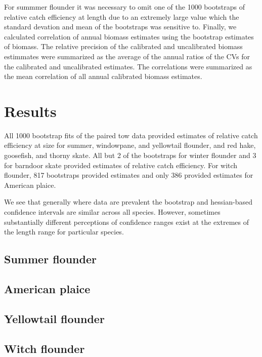 \documentclass[]{article}
\begin{document}
For summmer flounder it was necessary to omit one of the 1000 bootstraps
of relative catch efficiency at length due to an extremely large value
which the standard devation and mean of the bootstraps was sensitive to.
Finally, we calculated correlation of annual biomass estimates using the
bootstrap estimates of biomass. The relative precision of the calibrated
and uncalibrated biomass estimmates were summarized as the average of
the annual ratios of the CVs for the calibrated and uncalibrated
estimates. The correlations were summarized as the mean correlation of
all annual calibrated biomass estimates.

\hypertarget{results}{%
\section{Results}\label{results}}

All 1000 bootstrap fits of the paired tow data provided estimates of
relative catch efficiency at size for summer, windowpane, and yellowtail
flounder, and red hake, goosefish, and thorny skate. All but 2 of the
bootstraps for winter flounder and 3 for barndoor skate provided
estimates of relative catch efficiency. For witch flounder, 817
bootstraps provided estimates and only 386 provided estimates for
American plaice.

We see that generally where data are prevalent the bootstrap and
hessian-based confidence intervals are similar across all species.
However, sometimes substantially different perceptions of confidence
ranges exist at the extremes of the length range for particular species.

\hypertarget{summer-flounder}{%
\subsection{Summer flounder}\label{summer-flounder}}

\hypertarget{american-plaice}{%
\subsection{American plaice}\label{american-plaice}}

\hypertarget{yellowtail-flounder}{%
\subsection{Yellowtail flounder}\label{yellowtail-flounder}}

\hypertarget{witch-flounder}{%
\subsection{Witch flounder}\label{witch-flounder}}
\end{document}
